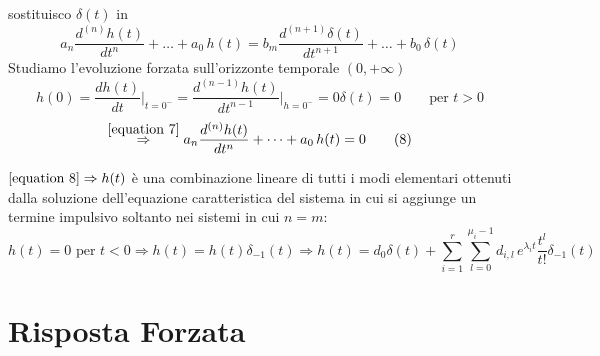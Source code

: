 sostituisco $\delta (t)$ in %
\begin{equation}
	a_n \frac{d^{(n)} h(t)}{dt^n}+\dots+a_0\,h(t) = b_m \frac{d^{(n+1)} \delta(t)}{dt^{n+1}}+\dots+b_0\,\delta(t) %
	\tag{7}\label{equation 7}
\end{equation}
Studiamo l'evoluzione forzata sull'orizzonte temporale $(0,+\infty)$ %
\[
	h(0) = \frac{dh(t)}{dt}\bigg\vert_{t=0^-}
	=\frac{d^{(n-1)}h(t)}{dt^{n-1}}\bigg\vert_{h=0^-}
	= 0
	\delta(t) = 0 \qquad\text{per } t>0
\]
\begin{equation}
	\overset{\eqref{equation 7}}{\Rightarrow}a_n \frac{d^{(n)} h(t)}{dt^n}+\dots+a_0\,h(t) = 0 
	\tag{8}\label{equation 8}
\end{equation}
	
\begin{oss}
	$\eqref{equation 8} \Rightarrow h (t)$ è una combinazione lineare di tutti i modi elementari ottenuti dalla soluzione dell'equazione caratteristica del sistema%
	in cui si aggiunge un termine impulsivo soltanto nei sistemi in cui $n=m$:
	\begin{equation}
		h(t)=0 \text{ per } t<0 \Rightarrow h(t) = h(t)\delta_{-1} (t)
		\Rightarrow h(t)= d_0 \delta(t) + \sum_{i=1}^{r}\sum_{l=0}^{\mu_i-1}d_{i,l} \,e^{\lambda_it}\frac{t^l}{t!}\delta_{-1} (t)
		\tag{9}\label{equation 9}
	\end{equation}
\end{oss}


\section{Risposta Forzata}
